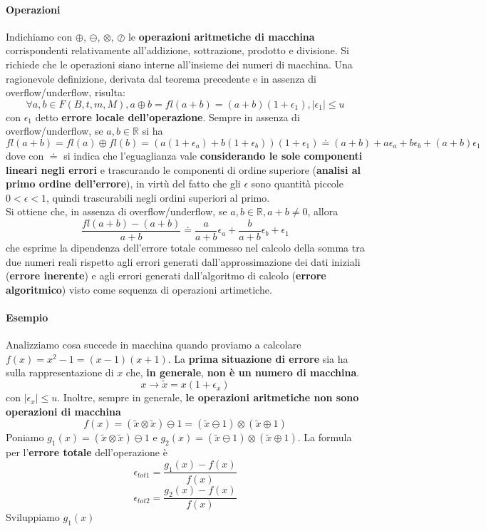 \documentclass[10pt]{book}
\begin{document}
\paragraph{Operazioni} Indichiamo con $\oplus$, $\ominus$, $\otimes$, $\oslash$ le \textbf{operazioni aritmetiche di macchina} corrispondenti relativamente all'addizione, sottrazione, prodotto e divisione. Si richiede che le operazioni siano interne all'insieme dei numeri di macchina. Una ragionevole definizione, derivata dal teorema precedente e in assenza di overflow/underflow, risulta: $$\forall a, b \in F(B, t, m, M), a \oplus b = fl(a + b) = (a + b)(1 + \epsilon_1), |\epsilon_1| \leq u$$ con $\epsilon_1$ detto  \textbf{errore locale dell'operazione}. Sempre in assenza di overflow/underflow, se $a, b \in \mathbb{R}$ si ha $$fl(a + b) = fl(a)\oplus fl(b) = (a(1 + \epsilon_a) + b(1 + \epsilon_b))(1 + \epsilon_1) \doteq (a + b) + a\epsilon_a + b\epsilon_b + (a + b)\epsilon_1$$ dove con $\doteq$ si indica che l'eguaglianza vale \textbf{considerando le sole componenti lineari negli errori} e trascurando le componenti di ordine superiore (\textbf{analisi al primo ordine dell'errore}), in virtù del fatto che gli $\epsilon$ sono quantità piccole $0 < \epsilon < 1$, quindi trascurabili negli ordini superiori al primo.\\
Si ottiene che, in assenza di overflow/underflow, se $a, b \in \mathbb{R}, a + b \neq 0$, allora $$\frac{fl(a + b) - (a + b)}{a + b} \doteq \frac{a}{a + b}\epsilon_a + \frac{b}{a + b}\epsilon_b + \epsilon_1$$ che esprime la dipendenza dell'errore totale commesso nel calcolo della somma tra due numeri reali rispetto agli errori generati dall'approssimazione dei dati iniziali (\textbf{errore inerente}) e agli errori generati dall'algoritmo di calcolo (\textbf{errore algoritmico}) visto come sequenza di operazioni artimetiche.\\
\pagebreak
\paragraph{Esempio}
Analizziamo cosa succede in macchina quando proviamo a calcolare $f(x) = x^2 - 1 = (x - 1)(x + 1)$. La \textbf{prima situazione di errore} sia ha sulla rappresentazione di $x$ che, \textbf{in generale}, \textbf{non è un numero di macchina}.$$x \rightarrow \tilde{x} = x(1 + \epsilon_x)$$ con $|\epsilon_x| \leq u$. Inoltre, sempre in generale, \textbf{le operazioni aritmetiche non sono operazioni di macchina} $$f(x) = (\tilde{x} \otimes \tilde{x}) \ominus 1 = (\tilde{x} \ominus 1)\otimes(\tilde{x} \oplus 1)$$Poniamo $g_1(x) = (\tilde{x} \otimes \tilde{x}) \ominus 1$ e $g_2(x) = (\tilde{x} \ominus 1)\otimes(\tilde{x} \oplus 1)$. La formula per l'\textbf{errore totale} dell'operazione è $$\epsilon_{tot1} = \frac{g_1(x) - f(x)}{f(x)}$$ $$\epsilon_{tot2} = \frac{g_2(x) - f(x)}{f(x)}$$ Sviluppiamo $g_1(x)$
\end{document}
